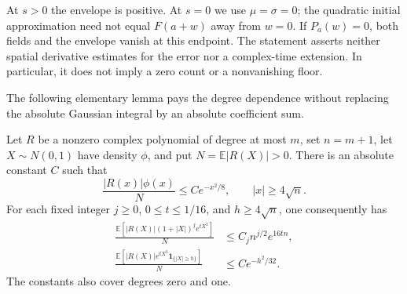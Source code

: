 At $s>0$ the envelope is positive. At $s=0$ we use
$\mu=\sigma=0$; the quadratic initial approximation need not equal
$F(a+w)$ away from $w=0$. If $P_a(w)=0$, both fields and the envelope
vanish at this endpoint. The statement asserts neither spatial
derivative estimates for the error nor a complex-time extension.
In particular, it does not imply a zero count or a nonvanishing floor.

The following elementary lemma pays the degree dependence without
replacing the absolute Gaussian integral by an absolute coefficient sum.

\begin{lemma}
\label{na-polynomial-lemma}
Let $R$ be a nonzero complex polynomial of degree at most $m$, set
$n=m+1$, let $X\sim N(0,1)$ have density $\phi$, and put
$N=\mathbb E|R(X)|>0$. There is an absolute constant $C$ such that
\begin{equation}
 \frac{|R(x)|\phi(x)}N\le Ce^{-x^2/8},
                       \qquad |x|\ge4\sqrt n.
 \label{na-polynomial-tail-density}
\end{equation}
For each fixed integer $j\ge0$, $0\le t\le1/16$, and
$h\ge4\sqrt n$, one consequently has
\begin{align}
 \frac{\mathbb E[|R(X)|(1+|X|)^je^{tX^2}]}N
   &\le C_j n^{j/2}e^{16tn},
 \label{na-polynomial-weighted-moment}\\
 \frac{\mathbb E[|R(X)|e^{tX^2}\mathbf1_{\{|X|\ge h\}}]}N
   &\le Ce^{-h^2/32}.
 \label{na-polynomial-tail-moment}
\end{align}
The constants also cover degrees zero and one.
\end{lemma}
